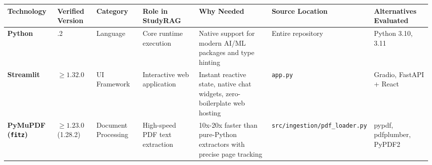 \documentclass[
]{article}
\begin{document}
\begingroup\scriptsize
\begin{longtable}[]{@{}
  >{\raggedright\arraybackslash\sloppy}p{}
  >{\raggedright\arraybackslash\sloppy}p{}
  >{\raggedright\arraybackslash\sloppy}p{}
  >{\raggedright\arraybackslash\sloppy}p{}
  >{\raggedright\arraybackslash\sloppy}p{}
  >{\raggedright\arraybackslash\sloppy}p{}
  >{\raggedright\arraybackslash\sloppy}p{}@{}}
\toprule\noalign{}
\begin{minipage}[b]{\linewidth}\raggedright
Technology
\end{minipage} & \begin{minipage}[b]{\linewidth}\raggedright
Verified Version
\end{minipage} & \begin{minipage}[b]{\linewidth}\raggedright
Category
\end{minipage} & \begin{minipage}[b]{\linewidth}\raggedright
Role in StudyRAG
\end{minipage} & \begin{minipage}[b]{\linewidth}\raggedright
Why Needed
\end{minipage} & \begin{minipage}[b]{\linewidth}\raggedright
Source Location
\end{minipage} & \begin{minipage}[b]{\linewidth}\raggedright
Alternatives Evaluated
\end{minipage} \\
\midrule\noalign{}
\endhead
\bottomrule\noalign{}
\endlastfoot
\textbf{Python} & 3.12.2 & Language & Core runtime execution & Native
support for modern AI/ML packages and type hinting & Entire repository &
Python 3.10, 3.11 \\
\textbf{Streamlit} & \(\ge 1.32.0\) & UI Framework & Interactive web
application & Instant reactive state, native chat widgets,
zero-boilerplate web hosting & \texttt{app.\allowbreak py} & Gradio, FastAPI +
React \\
\textbf{PyMuPDF (\texttt{fitz})} & \(\ge 1.23.0\) (1.28.2) & Document
Processing & High-speed PDF text extraction & 10x-20x faster than
pure-Python extractors with precise page tracking &
\texttt{src/\allowbreak ingestion/\allowbreak pdf\_\allowbreak loader.\allowbreak py} & pypdf, pdfplumber, PyPDF2 \\

\end{longtable}
\end{document}
